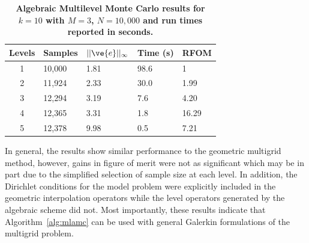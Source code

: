 \documentclass[note]{TechNote}
\begin{document}
\begin{table}[h!]
  \begin{center}
    \begin{tabular}{cllll}\hline\hline
      \multicolumn{1}{c}{\textbf{Levels}} & 
      \multicolumn{1}{l}{\textbf{Samples}} & 
      \multicolumn{1}{l}{\textbf{$||\ve{e}||_{\infty}$}} & 
      \multicolumn{1}{l}{\textbf{Time (s)}} & 
      \multicolumn{1}{l}{\textbf{RFOM}} \\
      \hline
      1 & 10,000 & 1.81 & 98.6 & 1 \\
      2 & 11,924 & 2.33 & 30.0 & 1.99 \\
      3 & 12,294 & 3.19 & 7.6 & 4.20 \\
      4 & 12,365 & 3.31 & 1.8 & 16.29 \\
      5 & 12,378 & 9.98 & 0.5 & 7.21 \\
      \hline\hline
    \end{tabular}
  \end{center}
  \caption{\textbf{Algebraic Multilevel Monte Carlo results for $k =
      10$ with $M = 3$, $N = 10,000$ and run times reported in
      seconds.}}
  \label{tab:ml_k10_results}
\end{table}
In general, the results show similar performance to the geometric
multigrid method, however, gains in figure of merit were not as
significant which may be in part due to the simplified selection of
sample size at each level. In addition, the Dirichlet conditions for
the model problem were explicitly included in the geometric
interpolation operators while the level operators generated by the
algebraic scheme did not. Most importantly, these results indicate
that Algorithm~\ref{alg:mlamc} can be used with general Galerkin
formulations of the multigrid problem.

\clearpage




\closing
\caution
\end{document}
